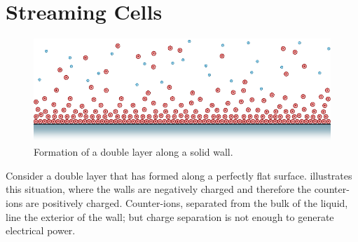 

\section{Streaming Cells}
  \label{sect:background_streamingCells}


  \begin{figure}
      \centering
      \includegraphics{content/pt1/01-PowerHarvesting/graphics/intro_2_wall}
      \caption{
        \label{fig:doubleLayerBetweenWalls}
        Formation of a double layer along a solid wall.
      }
  \end{figure}
  Consider a double layer that has formed along a perfectly flat surface.
   illustrates this situation, where the walls are negatively charged and therefore the counter-ions are positively charged.
  Counter-ions, separated from the bulk of the liquid, line the exterior of the wall; but charge separation is not enough to generate electrical power.

